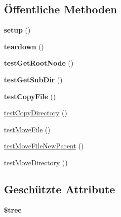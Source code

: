 \subsection*{Öffentliche Methoden}
\begin{DoxyCompactItemize}
\item 
\mbox{\label{class_sabre_1_1_d_a_v_1_1_object_tree_test_a9622d3dd77046faa05ce2a31eaae6683}} 
{\bfseries setup} ()
\item 
\mbox{\label{class_sabre_1_1_d_a_v_1_1_object_tree_test_aa82dd0034696d40f73736094452b81d5}} 
{\bfseries teardown} ()
\item 
\mbox{\label{class_sabre_1_1_d_a_v_1_1_object_tree_test_ab88078ed117e3ba6413fa9b4cc0e2a3b}} 
{\bfseries test\+Get\+Root\+Node} ()
\item 
\mbox{\label{class_sabre_1_1_d_a_v_1_1_object_tree_test_a672b2e9a0783d63baa7bc0081c4c768e}} 
{\bfseries test\+Get\+Sub\+Dir} ()
\item 
\mbox{\label{class_sabre_1_1_d_a_v_1_1_object_tree_test_a17a99fc1991eb8c629b944cd2ceab04f}} 
{\bfseries test\+Copy\+File} ()
\item 
\mbox{\hyperlink{class_sabre_1_1_d_a_v_1_1_object_tree_test_af9e2262ff779077dd26e040334ee4a95}{test\+Copy\+Directory}} ()
\item 
\mbox{\hyperlink{class_sabre_1_1_d_a_v_1_1_object_tree_test_a2c358fa3632d69cc2cc969e3f14a3625}{test\+Move\+File}} ()
\item 
\mbox{\hyperlink{class_sabre_1_1_d_a_v_1_1_object_tree_test_ad74ddfd003e4e4854e0ff8bfb9fa57ea}{test\+Move\+File\+New\+Parent}} ()
\item 
\mbox{\hyperlink{class_sabre_1_1_d_a_v_1_1_object_tree_test_a4931917613a3c3d8d016300dad2e1ce4}{test\+Move\+Directory}} ()
\end{DoxyCompactItemize}
\subsection*{Geschützte Attribute}
\begin{DoxyCompactItemize}
\item 
\mbox{\label{class_sabre_1_1_d_a_v_1_1_object_tree_test_a8e574587eca4586c5ae58d2588f761a5}} 
{\bfseries \$tree}
\end{DoxyCompactItemize}


